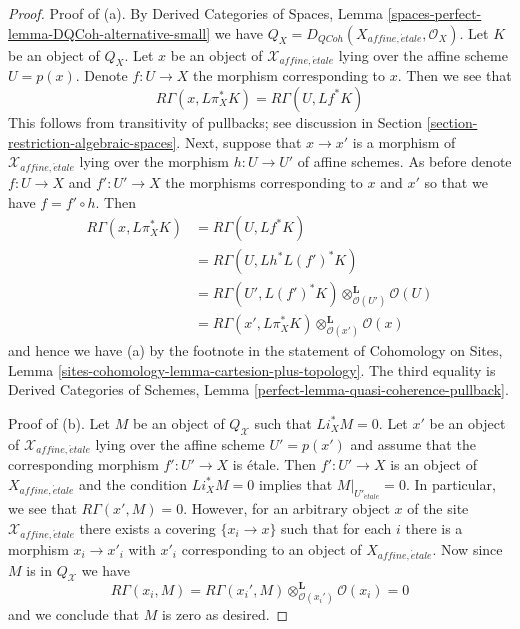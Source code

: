 \documentclass[10pt,a4paper]{amsart}
\theoremstyle{plain}
\theoremstyle{definition}
\theoremstyle{remark}
\numberwithin{equation}{subsection}
\def\etale{{\acute{e}tale}}
\def\QCoh{\mathit{QCoh}}
\begin{document}
\begin{proof}
\medskip\noindent
Proof of (a). By Derived Categories of Spaces, Lemma
\ref{spaces-perfect-lemma-DQCoh-alternative-small}
we have $Q_X = D_\QCoh(X_{affine, \etale}, \mathcal{O}_X)$.
Let $K$ be an object of $Q_X$. Let $x$ be an object of
$\mathcal{X}_{affine, \etale}$ lying over the affine
scheme $U = p(x)$. Denote $f : U \to X$ the morphism corresponding
to $x$. Then we see that
$$
R\Gamma(x, L\pi_X^*K) = R\Gamma(U, Lf^*K)
$$
This follows from transitivity of pullbacks; see discussion in
Section \ref{section-restriction-algebraic-spaces}.
Next, suppose that $x \to x'$ is a morphism of $\mathcal{X}_{affine, \etale}$
lying over the morphism $h : U \to U'$ of affine schemes.
As before denote $f : U \to X$ and $f' : U' \to X$ the morphisms
corresponding to $x$ and $x'$ so that we have $f = f' \circ h$.
Then
\begin{align*}
R\Gamma(x, L\pi_X^*K)
& =
R\Gamma(U, Lf^*K) \\
& =
R\Gamma(U, Lh^*L(f')^*K) \\
& =
R\Gamma(U', L(f')^*K) \otimes_{\mathcal{O}(U')}^\mathbf{L} \mathcal{O}(U) \\
& =
R\Gamma(x', L\pi_X^*K) \otimes_{\mathcal{O}(x')}^\mathbf{L} \mathcal{O}(x)
\end{align*}
and hence we have (a) by the footnote in the statement of
Cohomology on Sites, Lemma
\ref{sites-cohomology-lemma-cartesion-plus-topology}. The third equality is
Derived Categories of Schemes, Lemma
\ref{perfect-lemma-quasi-coherence-pullback}.

\medskip\noindent
Proof of (b). Let $M$ be an object of $Q_\mathcal{X}$
such that $Li_X^*M = 0$. Let $x'$ be an object of $\mathcal{X}_{affine, \etale}$
lying over the affine scheme $U' = p(x')$ and assume that the corresponding
morphism $f' : U' \to X$ is \'etale. Then $f' : U' \to X$ is an object of
$X_{affine, \etale}$ and the condition $Li_X^*M = 0$ implies that
$M|_{U'_\etale} = 0$. In particular, we see that $R\Gamma(x', M) = 0$.
However, for an arbitrary object $x$ of the site
$\mathcal{X}_{affine, \etale}$ there exists a covering $\{x_i \to x\}$
such that for each $i$ there is a morphism $x_i \to x'_i$ with
$x'_i$ corresponding to an object of $X_{affine, \etale}$.
Now since $M$ is in $Q_\mathcal{X}$ we have
$$
R\Gamma(x_i, M) =
R\Gamma(x_i', M) \otimes_{\mathcal{O}(x_i')}^\mathbf{L} \mathcal{O}(x_i) =
0
$$
and we conclude that $M$ is zero as desired.
\end{proof}
\end{document}
